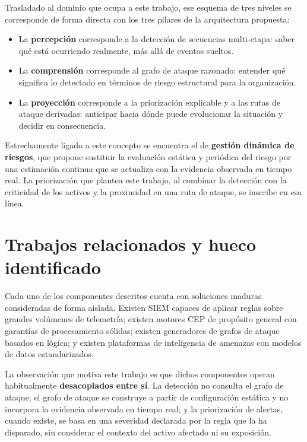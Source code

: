 Trasladado al dominio que ocupa a este trabajo, ese esquema de tres niveles se corresponde
de forma directa con los tres pilares de la arquitectura propuesta:

\begin{itemize}
    \item La \textbf{percepción} corresponde a la detección de secuencias multi-etapa: saber
    qué está ocurriendo realmente, más allá de eventos sueltos.
    \item La \textbf{comprensión} corresponde al grafo de ataque razonado: entender qué
    significa lo detectado en términos de riesgo estructural para la organización.
    \item La \textbf{proyección} corresponde a la priorización explicable y a las rutas de
    ataque derivadas: anticipar hacia dónde puede evolucionar la situación y decidir en
    consecuencia.
\end{itemize}

Estrechamente ligado a este concepto se encuentra el de \textbf{gestión dinámica de
riesgos}, que propone sustituir la evaluación estática y periódica del riesgo por una
estimación continua que se actualiza con la evidencia observada en tiempo real. La
priorización que plantea este trabajo, al combinar la detección con la criticidad de los
activos y la proximidad en una ruta de ataque, se inscribe en esa línea.

\section{Trabajos relacionados y hueco identificado}
\label{sec:relacionados}

Cada uno de los componentes descritos cuenta con soluciones maduras consideradas de forma
aislada. Existen SIEM capaces de aplicar reglas sobre grandes volúmenes de telemetría;
existen motores CEP de propósito general con garantías de procesamiento sólidas; existen
generadores de grafos de ataque basados en lógica; y existen plataformas de inteligencia de
amenazas con modelos de datos estandarizados.

La observación que motiva este trabajo es que dichos componentes operan habitualmente
\textbf{desacoplados entre sí}. La detección no consulta el grafo de ataque; el grafo de
ataque se construye a partir de configuración estática y no incorpora la evidencia observada
en tiempo real; y la priorización de alertas, cuando existe, se basa en una severidad
declarada por la regla que la ha disparado, sin considerar el contexto del activo afectado
ni su exposición.

